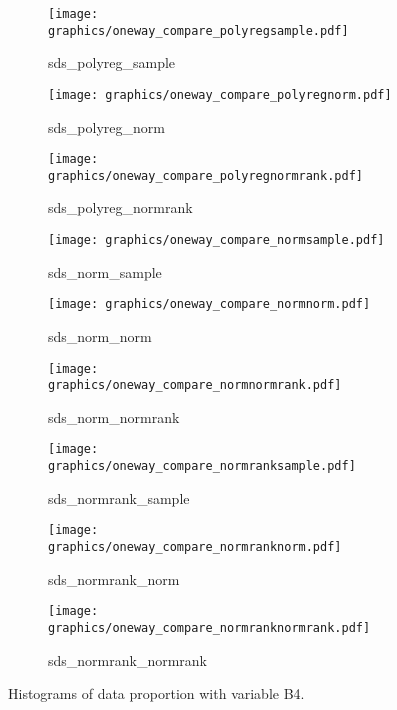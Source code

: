\newpage
\begin{figure}[H]\ContinuedFloat
    \begin{subfigure}{0.32\textwidth}
        \centering
        \texttt{[image: graphics/oneway\_compare\_polyregsample.pdf]}  
        \caption{sds\_polyreg\_sample}
        \label{subfig:polyregsampleb4}
    \end{subfigure}
    \begin{subfigure}{0.32\textwidth}
        \centering
        \texttt{[image: graphics/oneway\_compare\_polyregnorm.pdf]}  
        \caption{sds\_polyreg\_norm}
        \label{subfig:polyregnormb4}
    \end{subfigure}
    \begin{subfigure}{0.32\textwidth}
        \centering
        \texttt{[image: graphics/oneway\_compare\_polyregnormrank.pdf]}  
        \caption{sds\_polyreg\_normrank}
        \label{subfig:polyregnormrankb4}
    \end{subfigure}
    \medskip
    \begin{subfigure}{0.32\textwidth}
        \centering
        \texttt{[image: graphics/oneway\_compare\_normsample.pdf]}  
        \caption{sds\_norm\_sample}
        \label{subfig:normsampleb4}
    \end{subfigure}
    \begin{subfigure}{0.32\textwidth}
        \centering
        \texttt{[image: graphics/oneway\_compare\_normnorm.pdf]}  
        \caption{sds\_norm\_norm}
        \label{subfig:normnormb4}
    \end{subfigure}
    \begin{subfigure}{0.32\textwidth}
        \centering
        \texttt{[image: graphics/oneway\_compare\_normnormrank.pdf]}  
        \caption{sds\_norm\_normrank}
        \label{subfig:normnormrankb4}
    \end{subfigure}
    \medskip
    \begin{subfigure}{0.32\textwidth}
        \centering
        \texttt{[image: graphics/oneway\_compare\_normranksample.pdf]}  
        \caption{sds\_normrank\_sample}
        \label{subfig:normranksampleb4}
    \end{subfigure}
    \begin{subfigure}{0.32\textwidth}
        \centering
        \texttt{[image: graphics/oneway\_compare\_normranknorm.pdf]}  
        \caption{sds\_normrank\_norm}
        \label{subfig:normranknormb4}
    \end{subfigure}
    \begin{subfigure}{0.32\textwidth}
        \centering
        \texttt{[image: graphics/oneway\_compare\_normranknormrank.pdf]}  
        \caption{sds\_normrank\_normrank}
        \label{subfig:normranknormrankb4}
    \end{subfigure}
    \caption[]{Histograms of data proportion with variable B4.}
    \label{fig:B4-2}
\end{figure}

